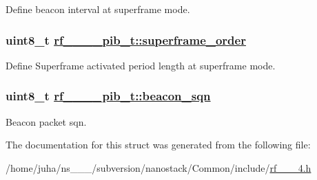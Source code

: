 Define beacon interval at superframe mode. \hypertarget{structrf__802__15__4__pib__t_a1f33d99ac1287bc5c3616f4d3a5ab55}{
\subsubsection[superframe\_\-order]{\setlength{\rightskip}{0pt plus 5cm}uint8\_\-t \hyperlink{structrf__802__15__4__pib__t_a1f33d99ac1287bc5c3616f4d3a5ab55}{rf\_\_\_\_\-pib\_\-t::superframe\_\-order}}}
\label{structrf__802__15__4__pib__t_a1f33d99ac1287bc5c3616f4d3a5ab55}


Define Superframe activated period length at superframe mode. \hypertarget{structrf__802__15__4__pib__t_766db8ff5040236ae2df52cb2c14cb0a}{
\subsubsection[beacon\_\-sqn]{\setlength{\rightskip}{0pt plus 5cm}uint8\_\-t \hyperlink{structrf__802__15__4__pib__t_766db8ff5040236ae2df52cb2c14cb0a}{rf\_\_\_\_\-pib\_\-t::beacon\_\-sqn}}}
\label{structrf__802__15__4__pib__t_766db8ff5040236ae2df52cb2c14cb0a}


Beacon packet sqn. 

The documentation for this struct was generated from the following file:\begin{CompactItemize}
\item 
/home/juha/ns\_\_\_/subversion/nanostack/Common/include/\hyperlink{rf__802__15__4_8h}{rf\_\_\_\-4.h}\end{CompactItemize}
